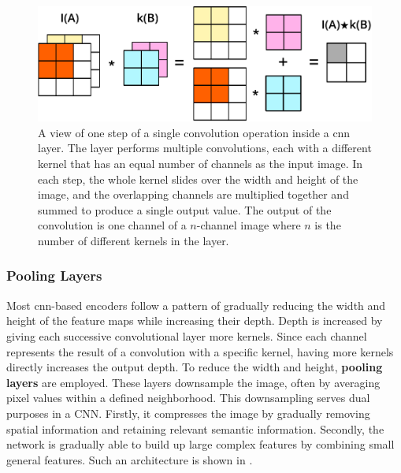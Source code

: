\begin{figure}[h!]
 \centering
 \includegraphics[width=0.8\linewidth]{images/cnn-operation-explained}
 \caption{A view of one step of a single convolution operation inside a \ac{cnn} layer. The layer performs multiple convolutions, each with a different kernel that has an equal number of channels as the input image. In each step, the whole kernel slides over the width and height of the image, and the overlapping channels are multiplied together and summed to produce a single output value. The output of the convolution is one channel of a $n$-channel image where $n$ is the number of different kernels in the layer.}
 \label{fig:cnn-conv-explained}
 \end{figure}
 
\subsubsection{Pooling Layers}

Most \ac{cnn}-based encoders follow a pattern of gradually reducing the width and height of the feature maps while increasing their depth. Depth is increased by giving each successive convolutional layer more kernels. Since each channel represents the result of a convolution with a specific kernel, having more kernels directly increases the output depth. To reduce the width and height, \textbf{pooling layers} are employed. These layers downsample the image, often by averaging pixel values within a defined neighborhood. This downsampling serves dual purposes in a CNN. Firstly, it compresses the image by gradually removing spatial information and retaining relevant semantic information. Secondly, the network is gradually able to build up large complex features by combining small general features. Such an architecture is shown in .

